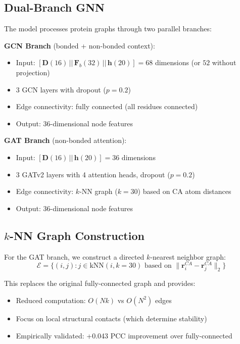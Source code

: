\subsection{Dual-Branch GNN}

The model processes protein graphs through two parallel branches:

\textbf{GCN Branch} (bonded + non-bonded context):
\begin{itemize}
    \item Input: $[\mathbf{D}(16) \,||\, \mathbf{F}_b(32) \,||\, \mathbf{h}(20)] = 68$ dimensions (or $52$ without projection)
    \item 3 GCN layers with dropout ($p = 0.2$)
    \item Edge connectivity: fully connected (all residues connected)
    \item Output: 36-dimensional node features
\end{itemize}

\textbf{GAT Branch} (non-bonded attention):
\begin{itemize}
    \item Input: $[\mathbf{D}(16) \,||\, \mathbf{h}(20)] = 36$ dimensions
    \item 3 GATv2 layers with 4 attention heads, dropout ($p = 0.2$)
    \item Edge connectivity: $k$-NN graph ($k = 30$) based on CA atom distances
    \item Output: 36-dimensional node features
\end{itemize}

\subsection{$k$-NN Graph Construction}

For the GAT branch, we construct a directed $k$-nearest neighbor graph:
\begin{equation}
    \mathcal{E} = \{(i, j) : j \in \text{kNN}(i, k=30) \text{ based on } \|\mathbf{r}_i^{CA} - \mathbf{r}_j^{CA}\|_2\}
\end{equation}

This replaces the original fully-connected graph and provides:
\begin{itemize}
    \item Reduced computation: $O(Nk)$ vs $O(N^2)$ edges
    \item Focus on local structural contacts (which determine stability)
    \item Empirically validated: +0.043 PCC improvement over fully-connected
\end{itemize}

